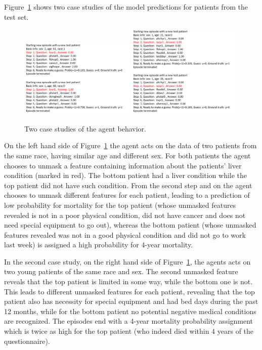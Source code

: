 \documentclass[reqno,11pt]{article}
\begin{document}
Figure~\ref{fig:cases} shows two case studies of the model predictions for patients from the test set.
\begin{figure}[h!]
  \centering
   \includegraphics[width=0.49\textwidth]{case_1.png}  
   \includegraphics[width=0.49\textwidth]{case_2.png}  
    \caption{Two case studies of the agent behavior.}
    \label{fig:cases}
\end{figure}
On the left hand side of Figure~\ref{fig:cases} the agent acts on the data of two patients from the same race, having similar age and different sex.
For both patients the agent chooses to unmask a feature containing information about the patients' liver condition (marked in red). The bottom patient had a liver condition while the top patient did not have such condition. From the second step and on the agent chooses to unmask different features for each patient, leading to a prediction of low probability for mortality for the top patient (whose unmasked features revealed is not in a poor physical condition, did not have cancer and does not need special equipment to go out), whereas the bottom patient (whose unmasked features revealed was not in a good physical condition and did not go to work last week) is assigned a high probability for 4-year mortality.

In the second case study, on the right hand side of Figure~\ref{fig:cases}, the agents acts on two young patients of the same race and sex. The second unmasked feature reveals that the top patient is limited in some way, while the bottom one is not. This leads to different unmasked features for each patient, revealing that the top patient also has necessity for special equipment and had bed days during the past 12 months, while for the bottom patient no potential negative medical conditions are recognized.  The episodes end with a 4-year mortality probability assignment which is twice as high for the top patient (who indeed died within 4 years of the questionnaire).
\end{document}
